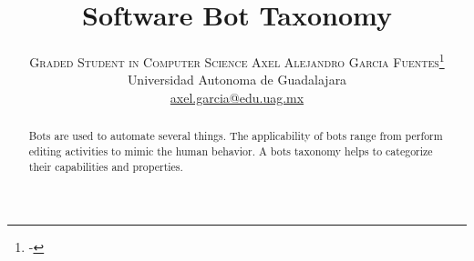 \documentclass[twoside]{article}
\title{\vspace{-15mm}\fontsize{24pt}{10pt}\selectfont\textbf{Software Bot Taxonomy}} %
\author{
\large
\textsc{Graded Student in Computer Science Axel Alejandro Garcia Fuentes}\thanks{-}\\[2mm] %
\normalsize Universidad Autonoma de Guadalajara \\ %
\normalsize \href{mailto:axel.garcia@edu.uag.mx}{axel.garcia@edu.uag.mx} %
\vspace{-5mm}
}
\date{}
\begin{document}
\maketitle %

\thispagestyle{fancy} %


\begin{abstract}

Bots are used to automate several things. The applicability of bots range from perform editing activities to mimic the human behavior.
A bots taxonomy helps to categorize their capabilities and properties.
\end{abstract}

\end{document}

